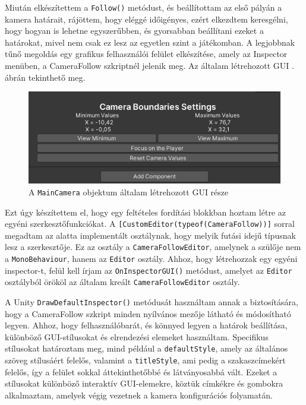 Miután elkészítettem a \texttt{Follow()} metódust, és beállítottam az első pályán a kamera határait, rájöttem, hogy eléggé időigényes, ezért elkezdtem keresgélni, hogy hogyan is lehetne egyszerűbben, és gyorsabban beállítani ezeket a határokat, mivel nem csak ez lesz az egyetlen szint a játékomban. A legjobbnak tűnő megoldás egy grafikus felhasználói felület elkészítése, amely az Inspector menüben, a CameraFollow szkriptnél jelenik meg. Az általam létrehozott GUI . ábrán tekinthető meg.

\begin{figure}[ht]
\centering
\includegraphics[scale = 0.9]{images/gui.png}
\caption{A \texttt{MainCamera} objektum általam létrehozott GUI része}
\label{fig:gui}
\end{figure}

\newpage
Ezt úgy készítettem el, hogy egy feltételes fordítási blokkban hoztam létre az egyéni szerkesztőfunkciókat. A \texttt{[CustomEditor(typeof(CameraFollow))]} sorral megadtam az alatta implementált osztálynak, hogy melyik futási idejű típusnak lesz a szerkesztője. Ez az osztály a \texttt{CameraFollowEditor}, amelynek a szülője nem a \texttt{MonoBehaviour}, hanem az \texttt{Editor} osztály. Ahhoz, hogy létrehozzak egy egyéni inspector-t, felül kell írjam az \texttt{OnInspectorGUI()} metódust, amelyet az \texttt{Editor} osztályból örököl az általam kreált \texttt{CameraFollowEditor} osztály.

A Unity \texttt{DrawDefaultInspector()} metódusát használtam annak a biztosítására, hogy a CameraFollow szkript minden nyílvános mezője látható és módosítható legyen. Ahhoz, hogy felhasználóbarát, és könnyed legyen a határok beállítása, különböző GUI-stílusokat és elrendezési elemeket használtam. Specifikus stílusokat határoztam meg, mind például a \texttt{defaultStyle}, amely az általános szöveg stílusáért felelős, valamint a \texttt{titleStyle}, ami pedig a szakaszcímekért felelős, így a felület sokkal áttekinthetőbbé és látványosabbá vált. Ezeket a stílusokat különböző interaktív GUI-elemekre, köztük címkékre és gombokra alkalmaztam, amelyek végig vezetnek a kamera konfigurációs folyamatán.

